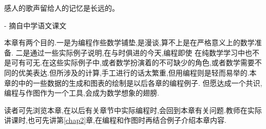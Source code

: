 \documentclass[main.tex]{subfiles}
\begin{document}
\begin{flushright}
	\begin{kaishu}
		感人的歌声留给人的记忆是长远的。\\
	\end{kaishu}
	- 摘自中学语文课文
\end{flushright}

本章有两个目的.一是为编程作些数学铺垫,是漫谈,算不上是在严格意义上的数学准备.
二是通过一些实际例子说明,在与时俱进的今天,编程即使
在纯数学学习中也不是可有可无.在这些实际例子中,或者数学扮演着的不可缺少的角色,或者数学需要不同的优美表达.但所涉及的计算,手工进行的话太繁重,但用编程则是轻而易举的.本章的中的一些数据的生成和图表的绘制是以后各章的编程例子.
但愿达成一个共识,编程与作图作为一个工具,会成为数学想象的翅膀.

读者可先浏览本章,在以后有关章节中实际编程时,会回到本章有关问题.教师在实际讲课时,也可先讲第\ref{chap2}章,在编程和作图时再结合例子介绍本章内容.
\end{document}

